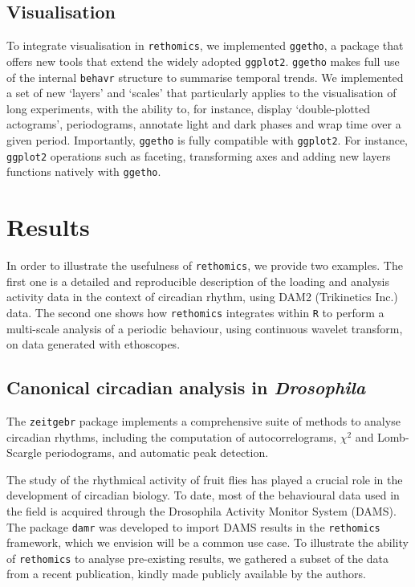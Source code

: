 \documentclass[10pt,letterpaper]{article}\usepackage[]{graphicx}\usepackage[]{color}
\begin{document}
\subsection*{Visualisation}

To integrate visualisation in \texttt{rethomics}, we implemented \texttt{ggetho},
a package that offers new tools that extend the widely adopted \texttt{ggplot2}\cite{wickham_ggplot2_2016}.
\texttt{ggetho} makes full use of the internal \texttt{behavr} structure to summarise temporal trends.
We implemented a set of new `layers' and `scales' that particularly applies to the visualisation of long experiments, with the ability to, for instance, display `double-plotted actograms', periodograms, annotate light and dark phases and wrap time over a given period. 
Importantly, \texttt{ggetho} is fully compatible with \texttt{ggplot2}. 
For instance, \texttt{ggplot2} operations such as faceting, transforming axes and adding new layers functions natively with \texttt{ggetho}.




\section*{Results}

In order to illustrate the usefulness of \texttt{rethomics}, we provide two examples.
The first one is a detailed and reproducible description of the loading and analysis activity data in the context of circadian rhythm, using DAM2 (Trikinetics Inc.) data.
The second one shows how \texttt{rethomics} integrates within \texttt{R} to perform a multi-scale analysis of a periodic behaviour, using continuous wavelet transform, on data generated with ethoscopes\cite{geissmann_ethoscopes_2017}.

\subsection*{Canonical circadian analysis in \emph{Drosophila}}
The \texttt{zeitgebr} package implements a comprehensive suite of methods to analyse circadian rhythms, 
including the computation of autocorrelograms, $\chi{}^2$\cite{sokolove_chi_1978} and Lomb-Scargle\cite{ruf_lomb-scargle_1999} periodograms,
and automatic peak detection.

The study of the rhythmical activity of fruit flies has played a crucial role in the development of circadian biology\cite{dubowy_circadian_2017}.
To date, most of the behavioural data used in the field is acquired through the Drosophila Activity Monitor System (DAMS).
The package \texttt{damr} was developed to import DAMS results in the \texttt{rethomics} framework, which we envision will be a common use case. 
To illustrate the ability of \texttt{rethomics} to analyse pre-existing results,
we gathered a subset of the data from a recent publication\cite{buhl_quasimodo_2016}, kindly made publicly available by the authors\cite{ogueta_ll_2018}.
\end{document}
